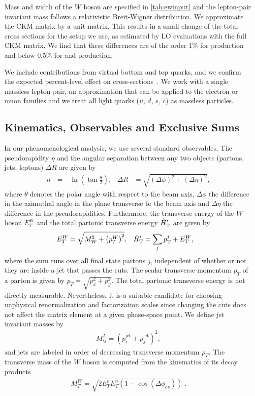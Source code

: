 Mass and width of the $W$ boson are specified in \cref{tab:ewinput} and the lepton-pair invariant mass follows a relativistic Breit-Wigner distribution. We approximate the CKM matrix by a unit matrix. This
results in a small change of the total cross sections for the setup we use, as
estimated by LO evaluations with the full CKM matrix. We find that these differences are of the order 1\% for \Wbb{} production and
below 0.5\% for \Wbbnj[1]{} and \Wbbnj[2]{} production.

We include contributions from virtual bottom and top quarks, and we confirm the
expected percent-level effect on
cross-sections~\cite{BH:W4j,BH:Z4j,Campbell:2016tcu}. We work with a single massless
lepton pair, an approximation that can be applied to the electron or muon
families and we treat all light quarks ($u$, $d$, $s$, $c$) as massless particles.

\subsection{Kinematics, Observables and Exclusive Sums}
\label{sec:kin}
In our phenomenological analysis, we use several standard observables. The pseudorapidity $\eta$ and the
angular separation between any two objects (partons, jets, leptons) $\Delta R$ are given by
\begin{align}
  \eta &= -\ln\left(\tan\frac{\theta}{2}\right),&  \Delta R &= \sqrt{(\Delta \phi)^2+(\Delta \eta)^2},
\end{align}
where $\theta$ denotes the polar angle with respect to the beam axis, $\Delta\phi$ the difference in the azimuthal angle in the
plane transverse to the beam axis and
$\Delta\eta$ the difference in the pseudorapidities. Furthermore, the transverse
energy of the $W$ boson $E_T^W$ and the total partonic transverse energy ${\hat H}_{\mathrm T}'$ are given by
\begin{align}\label{eq:htpart}
  E_T^W&=\sqrt{M_W^2+\left(p_T^W \right)^2},& {\hat H}_{\mathrm T}'&=\sum_j p_{\textrm T}^j+E_{\textrm T}^W,
\end{align}
where the sum runs over all final state partons $j$, independent of
whether or not they are inside a jet that passes the cuts. The scalar
transverse momentum $p_T$ of a parton is given by
$p_T=\sqrt{p_x^2+p_y^2}$. The total partonic transverse energy is not directly measurable. Nevertheless, it is
a suitable candidate for choosing unphysical renormalization and
factorization scales since changing the cuts does not affect the
matrix element at a given phase-space point. We define jet invariant masses by
\begin{align}
  M_{ij}^2 = \left(p_i^{\text{jet}}+p_j^{\text{jet}}\right)^2,
\end{align}
and jets are labeled in order of decreasing transverse momentum
$p_T$. The transverse mass of the $W$ boson is computed from the
kinematics of its decay products
\begin{align}
  M_T^W=\sqrt{2E_T^eE_T^\nu(1-\cos(\Delta\phi_{e\nu}))}\ .
\end{align}

